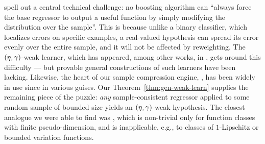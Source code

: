 \citet[Remark 2.1]{DuffyHelmbold02}
spell out a central
technical challenge:
no boosting algorithm can
``always force the
base regressor to output a useful function by simply modifying the distribution over the
sample''. This is because unlike a binary classifier, which localizes errors on specific examples,
a real-valued hypothesis can spread its error evenly over the entire sample,
and it will not be affected by reweighting.
The $(\eta,\gamma)$-weak learner,
which has appeared, among other works, in
\citet{DBLP:journals/cpc/AnthonyBIS96,DBLP:journals/siamcomp/Simon97,avnimelech1999boosting,kegl2003robust},
gets around this difficulty
---
but provable general constructions of such learners have been lacking.
Likewise, the heart of our sample compression engine, ,
has been widely in use since \citet{FreundSchapire97} in various guises.
Our Theorem~\ref{thm:gen-weak-learn}
supplies the remaining piece of the puzzle:
{\em any} sample-consistent regressor
applied to some random sample of bounded size
yields
an $(\eta,\gamma)$-weak hypothesis.
The closest analogue we were able to find was
\citet[Theorem 3]{DBLP:journals/cpc/AnthonyBIS96},
which is non-trivial only for function classes with finite pseudo-dimension,
and is inapplicable, e.g., to classes of $1$-Lipschitz or bounded variation functions.

%


